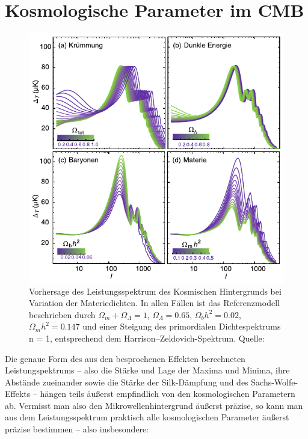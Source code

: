 \documentclass[10pt,a4paper]{article}
\begin{document}
\section{Kosmologische Parameter im CMB}
\begin{figure}[tbhp]
\center
\includegraphics[scale=0.8]{cmbvar}
\caption{Vorhersage des Leistungsspektrum des Kosmischen Hintergrunds bei Variation der Materiedichten. In allen Fällen ist das Referenzmodell beschrieben durch $\Omega_m + \Omega_\Lambda = 1$, $\Omega_\Lambda = 0.65$, $\Omega_b h^2 = 0.02$, $\Omega_m h^2 = 0.147$ und einer Steigung des primordialen Dichtespektrums n = 1, entsprechend dem Harrison–Zeldovich-Spektrum. Quelle: \cite{Schneider}}
\label{cmbvar}
\end{figure}
Die genaue Form des aus den besprochenen Effekten berechneten Leistungspektrums -- also die Stärke und Lage der Maxima und Minima, ihre Abstände zueinander sowie die Stärke der Silk-Dämpfung und des Sachs-Wolfe-Effekts -- hängen teils äußerst empfindlich von den kosmologischen Parametern ab. Vermisst man also den Mikrowellenhintergrund äußerst präzise, so kann man aus dem Leistungsspektrum praktisch alle kosmologischen Parameter äußerst präzise bestimmen -- also insbesondere:
\end{document}
